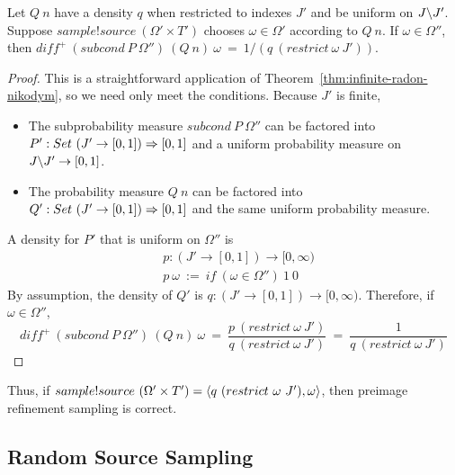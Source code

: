 \begin{theorem}
Let $Q~n$ have a density $q$ when restricted to indexes $J'$ and be uniform on $J \backslash J'$.
Suppose $sample!source~(\Omega' \times T')$ chooses $\omega \in \Omega'$ according to $Q~n$.
If $\omega \in \Omega''$, then $diff^+~(subcond~P~\Omega'')~(Q~n)~\omega\ =\ 1{/}(q~(restrict~\omega~J'))$.
\end{theorem}
\begin{proof}
This is a straightforward application of Theorem~\ref{thm:infinite-radon-nikodym}, so we need only meet the conditions.
Because $J'$ is finite,
\begin{itemize}
	\item The subprobability measure $subcond~P~\Omega''$ can be factored into $P' : Set~(J' \to [0,1]) \Rightarrow [0,1]$ and a uniform probability measure on $J \backslash J' \to [0,1]$.
	\item The probability measure $Q~n$ can be factored into $Q' : Set~(J' \to [0,1]) \Rightarrow [0,1]$ and the same uniform probability measure.
\end{itemize}
A density for $P'$ that is uniform on $\Omega''$ is
\begin{equation}
\begin{aligned}
	&p : (J' \to [0,1]) \to [0,\infty) \\
	&p~\omega\ :=\ if~(\omega \in \Omega'')~1~0
\end{aligned}
\end{equation}
By assumption, the density of $Q'$ is $q : (J' \to [0,1]) \to [0,\infty)$.
Therefore, if $\omega \in \Omega''$,
\begin{equation}
	diff^+~(subcond~P~\Omega'')~(Q~n)~\omega
		\ =\ \frac{p~(restrict~\omega~J')}{q~(restrict~\omega~J')}
		\ =\ \frac{1}{q~(restrict~\omega~J')}
\end{equation}
\end{proof}

Thus, if $sample!source~(\Omega' \times T') = \langle{q~(restrict~\omega~J'), \omega}\rangle$, then preimage refinement sampling is correct.

\subsection{Random Source Sampling}

